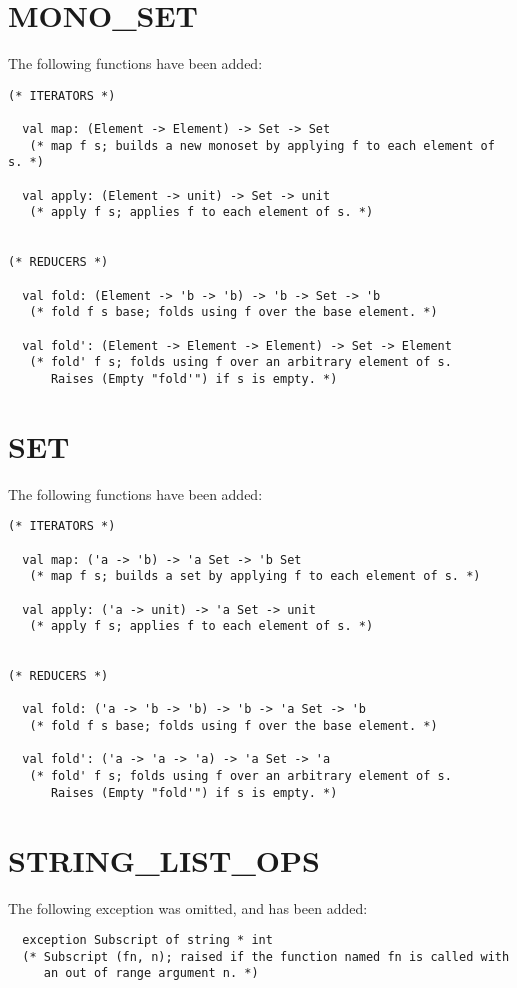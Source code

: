 \newpage
\section{MONO\_SET}
The following functions have been added:
\begin{verbatim}
(* ITERATORS *)

  val map: (Element -> Element) -> Set -> Set
   (* map f s; builds a new monoset by applying f to each element of s. *)

  val apply: (Element -> unit) -> Set -> unit
   (* apply f s; applies f to each element of s. *)


(* REDUCERS *)

  val fold: (Element -> 'b -> 'b) -> 'b -> Set -> 'b
   (* fold f s base; folds using f over the base element. *)

  val fold': (Element -> Element -> Element) -> Set -> Element
   (* fold' f s; folds using f over an arbitrary element of s.
      Raises (Empty "fold'") if s is empty. *)
\end{verbatim}

\newpage
\section{SET}
The following functions have been added:
\begin{verbatim}
(* ITERATORS *)

  val map: ('a -> 'b) -> 'a Set -> 'b Set
   (* map f s; builds a set by applying f to each element of s. *)

  val apply: ('a -> unit) -> 'a Set -> unit
   (* apply f s; applies f to each element of s. *)


(* REDUCERS *)

  val fold: ('a -> 'b -> 'b) -> 'b -> 'a Set -> 'b
   (* fold f s base; folds using f over the base element. *)

  val fold': ('a -> 'a -> 'a) -> 'a Set -> 'a
   (* fold' f s; folds using f over an arbitrary element of s.
      Raises (Empty "fold'") if s is empty. *)
\end{verbatim}

\newpage
\section{STRING\_LIST\_OPS}
The following exception was omitted, and has been added:
\begin{verbatim}
  exception Subscript of string * int
  (* Subscript (fn, n); raised if the function named fn is called with
     an out of range argument n. *)
\end{verbatim}



